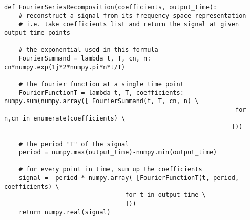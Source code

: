 \pagebreak
\begin{lstlisting}
def FourierSeriesRecomposition(coefficients, output_time):
    # reconstruct a signal from its frequency space representation
    # i.e. take coefficients list and return the signal at given output_time points

    # the exponential used in this formula
    FourierSummand = lambda t, T, cn, n: cn*numpy.exp(1j*2*numpy.pi*n*t/T)

    # the fourier function at a single time point
    FourierFunctionT = lambda t, T, coefficients: numpy.sum(numpy.array([ FourierSummand(t, T, cn, n) \
                                                               for n,cn in enumerate(coefficients) \
                                                              ]))

    # the period "T" of the signal
    period = numpy.max(output_time)-numpy.min(output_time)

    # for every point in time, sum up the coefficients
    signal =  period * numpy.array( [FourierFunctionT(t, period, coefficients) \
                                 for t in output_time \
                                 ]))
    return numpy.real(signal)

\end{lstlisting}
